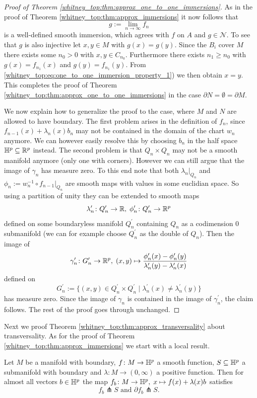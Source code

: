\begin{proof}[Proof of Theorem \ref{whitney_top:thm:approx_one_to_one_immersions}]
    As in the proof of Theorem \ref{whitney_top:thm:approx_immersions} it now follows that 
    \[
    g := \lim_{n \to \infty} f_n
    \]
    is a well-defined smooth immersion, which agrees with $f$ on $A$ and $g \in \mathcal{N}$. To see that $g$ is also injective let $x, y \in M$ with $g(x) = g(y)$. Since the $B_i$ cover $M$ there exists some $n_0 >0$ with $x,y \in C_{n_0}$. Furthermore there exists $n_1 \geq n_0$ with $g(x) = f_{n_1}(x)$ and $g(y) = f_{n_1}(y)$. From \ref{whitney_top:eq:one_to_one_immersion_property_1}) we then obtain $x = y$. This completes the proof of Theorem \ref{whitney_top:thm:approx_one_to_one_immersions} in the case $\partial N = \emptyset = \partial M$. 
    
    We now explain how to generalize the proof to the case, where $M$ and $N$ are allowed to have boundary. The first problem arises in the definition of $f_n$, since $f_{n-1}(x) + \lambda_n(x)b_n$ may not be contained in the domain of the chart $w_n$ anymore. We can however easily resolve this by choosing $b_n$ in the half space $\mathbb{H}^p \subseteq \mathbb{R}^p$ instead. The second problem is that $Q_n \times Q_n$ may not be a smooth manifold anymore (only one with corners). However we can still argue that the image of $\gamma_n$ has measure zero. To this end note that both $\lambda_n|_{Q_n}$ and $\phi_n := w_n^{-1} \circ f_{n-1}|_{Q_n}$ are smooth maps with values in some euclidian space. So using a partition of unity they can be extended to smooth maps 
    \[
    \lambda^\prime_n \colon Q^\prime_n \to \mathbb{R}, \; \phi^\prime_n \colon Q^\prime_n \to \mathbb{R}^p
    \]
    defined on some boundaryless manifold $Q^\prime_n$ containing $Q_n$ as a codimension $0$ submanifold (we can for example choose $Q^\prime_n$ as the double of $Q_n$). Then the image of 
    \[
    \gamma^\prime_n \colon G^\prime_n \to \mathbb{R}^p, \; (x,y) \mapsto \frac{\phi^\prime_n(x) - \phi^\prime_n(y)}{\lambda^\prime_n(y) - \lambda^\prime_n(x)}
    \]
    defined on 
    \[
    G^\prime_n := \{(x,y) \in Q^\prime_n \times Q^\prime_n \mid \lambda^\prime_n(x) \neq \lambda^\prime_n(y)\}
    \]
    has measure zero. Since the image of $\gamma_n$ is contained in the image of $\gamma^\prime_n$, the claim follows. The rest of the proof goes through unchanged.
\end{proof}

Next we proof Theorem \ref{whitney_top:thm:approx_transversality} about transversality. As for the proof of Theorem \ref{whitney_top:thm:approx_immersions} we start with a local result.

\begin{lemma}
    \label{whitney_top:lem:approx_transversality_lemma}
    Let $M$ be a manifold with boundary, $f \colon M \to \mathbb{H}^p$ a smooth function, $S \subseteq \mathbb{H}^p$ a submanifold with boundary and $\lambda \colon M \to (0,\infty)$ a positive function. Then for almost all vectors $b \in \mathbb{H}^p$ the map
    $f_b \colon M \to \mathbb{H}^p, \; x \mapsto f(x) + \lambda(x)b$ satisfies
    \[
    f_b \pitchfork S \text{ and } \partial f_b \pitchfork S.
    \]
\end{lemma}

